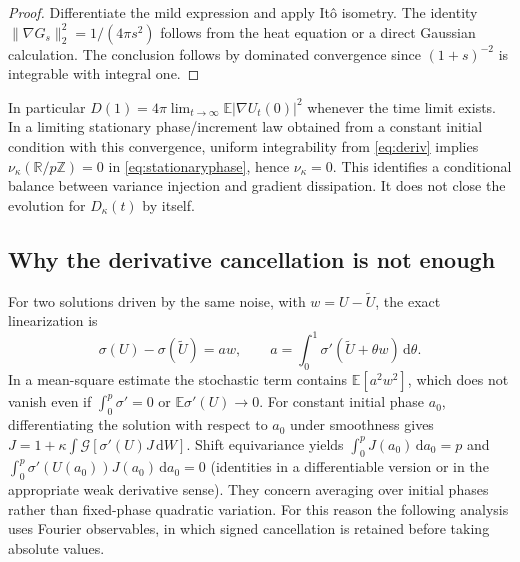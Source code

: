 \documentclass[11pt]{article}
\numberwithin{equation}{section}
\theoremstyle{definition}
\theoremstyle{remark}
\newcommand{\R}{\mathbb R}
\newcommand{\E}{\mathbb E}
\newcommand{\clG}{\mathcal G}
\newcommand{\dd}{\,\mathrm d}
\begin{document}
\begin{proof}
Differentiate the mild expression and apply It\^o isometry. The identity $\|\nabla G_s\|_2^2=1/(4\pi s^2)$ follows from the heat equation or a direct Gaussian calculation. The conclusion follows by dominated convergence since $(1+s)^{-2}$ is integrable with integral one.
\end{proof}
In particular $D(1)=4\pi\lim_{t\to\infty}\E|\nabla U_t(0)|^2$ whenever the time limit exists. In a limiting stationary phase/increment law obtained from a constant initial condition with this convergence, uniform integrability from \eqref{eq:deriv} implies $\nu_\kappa(\R/p\mathbb Z)=0$ in \eqref{eq:stationaryphase}, hence $\nu_\kappa=0$. This identifies a conditional balance between variance injection and gradient dissipation. It does not close the evolution for $D_\kappa(t)$ by itself.

\subsection{Why the derivative cancellation is not enough}
For two solutions driven by the same noise, with $w=U-\widetilde U$, the exact linearization is
\[
 \sigma(U)-\sigma(\widetilde U)=aw,\qquad
 a=\int_0^1\sigma'(\widetilde U+\theta w)\dd\theta.
\]
In a mean-square estimate the stochastic term contains $\E[a^2w^2]$, which does not vanish even if $\int_0^p\sigma'=0$ or $\E\sigma'(U)\to0$. For constant initial phase $a_0$, differentiating the solution with respect to $a_0$ under smoothness gives $J=1+\kappa\int\clG[\sigma'(U)J\dd W]$. Shift equivariance yields $\int_0^p J(a_0)\dd a_0=p$ and $\int_0^p\sigma'(U(a_0))J(a_0)\dd a_0=0$ (identities in a differentiable version or in the appropriate weak derivative sense). They concern averaging over initial phases rather than fixed-phase quadratic variation. For this reason the following analysis uses Fourier observables, in which signed cancellation is retained before taking absolute values.
\end{document}
